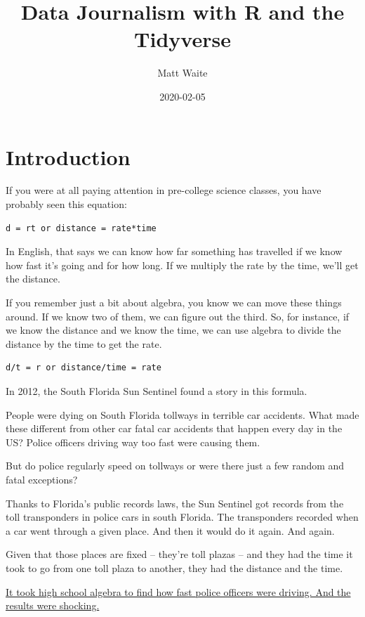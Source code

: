 \documentclass[]{book}
\title{Data Journalism with R and the Tidyverse}
\author{Matt Waite}
\date{2020-02-05}
\begin{document}
\maketitle

{
\setcounter{tocdepth}{1}
\tableofcontents
}
\hypertarget{introduction}{%
\chapter{Introduction}\label{introduction}}

If you were at all paying attention in pre-college science classes, you have probably seen this equation:

\begin{verbatim}
d = rt or distance = rate*time
\end{verbatim}

In English, that says we can know how far something has travelled if we know how fast it's going and for how long. If we multiply the rate by the time, we'll get the distance.

If you remember just a bit about algebra, you know we can move these things around. If we know two of them, we can figure out the third. So, for instance, if we know the distance and we know the time, we can use algebra to divide the distance by the time to get the rate.

\begin{verbatim}
d/t = r or distance/time = rate
\end{verbatim}

In 2012, the South Florida Sun Sentinel found a story in this formula.

People were dying on South Florida tollways in terrible car accidents. What made these different from other car fatal car accidents that happen every day in the US? Police officers driving way too fast were causing them.

But do police regularly speed on tollways or were there just a few random and fatal exceptions?

Thanks to Florida's public records laws, the Sun Sentinel got records from the toll transponders in police cars in south Florida. The transponders recorded when a car went through a given place. And then it would do it again. And again.

Given that those places are fixed -- they're toll plazas -- and they had the time it took to go from one toll plaza to another, they had the distance and the time.

\href{http://www.sun-sentinel.com/news/local/speeding-cops/fl-speeding-cops-20120211,0,3706919.story}{It took high school algebra to find how fast police officers were driving. And the results were shocking.}
\end{document}
